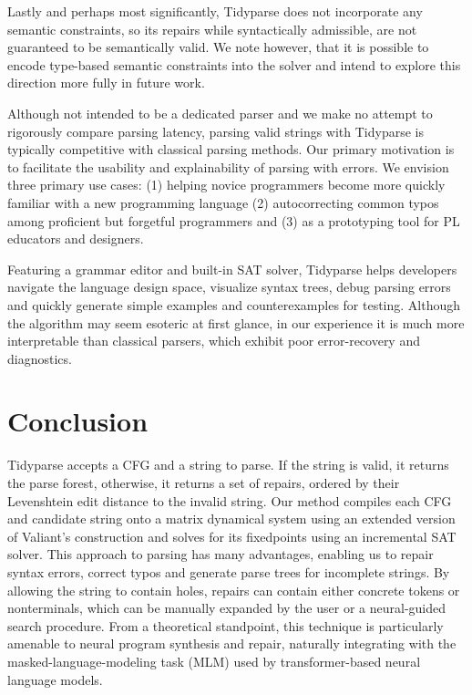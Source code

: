 \documentclass[sigplan,nonacm]{acmart}\settopmatter{printfolios=false,printccs=false,printacmref=false}
\begin{document}
Lastly and perhaps most significantly, Tidyparse does not incorporate any semantic constraints, so its repairs while syntactically admissible, are not guaranteed to be semantically valid. We note however, that it is possible to encode type-based semantic constraints into the solver and intend to explore this direction more fully in future work.

Although not intended to be a dedicated parser and we make no attempt to rigorously compare parsing latency, parsing valid strings with Tidyparse is typically competitive with classical parsing methods. Our primary motivation is to facilitate the usability and explainability of parsing with errors. We envision three primary use cases: (1) helping novice programmers become more quickly familiar with a new programming language (2) autocorrecting common typos among proficient but forgetful programmers and (3) as a prototyping tool for PL educators and designers.

Featuring a grammar editor and built-in SAT solver, Tidyparse helps developers navigate the language design space, visualize syntax trees, debug parsing errors and quickly generate simple examples and counterexamples for testing. Although the algorithm may seem esoteric at first glance, in our experience it is much more interpretable than classical parsers, which exhibit poor error-recovery and diagnostics.

\section{Conclusion}

Tidyparse accepts a CFG and a string to parse. If the string is valid, it returns the parse forest, otherwise, it returns a set of repairs, ordered by their Levenshtein edit distance to the invalid string. Our method compiles each CFG and candidate string onto a matrix dynamical system using an extended version of Valiant's construction and solves for its fixedpoints using an incremental SAT solver. This approach to parsing has many advantages, enabling us to repair syntax errors, correct typos and generate parse trees for incomplete strings. By allowing the string to contain holes, repairs can contain either concrete tokens or nonterminals, which can be manually expanded by the user or a neural-guided search procedure. From a theoretical standpoint, this technique is particularly amenable to neural program synthesis and repair, naturally integrating with the masked-language-modeling task (MLM) used by transformer-based neural language models.
\end{document}
